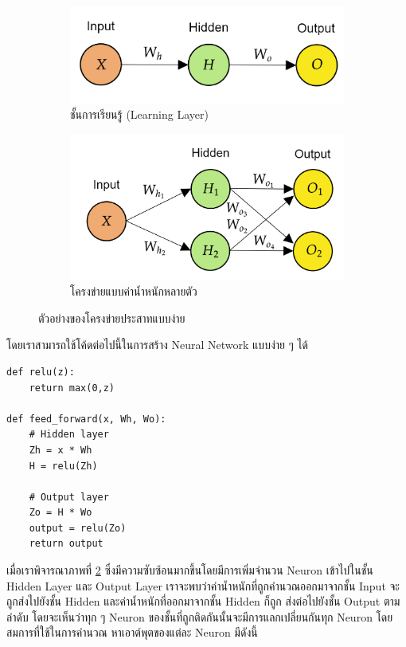 \begin{figure}[H]
    \centering
    \begin{subfigure}{0.5\textwidth}
        \centering
        \includegraphics[width=0.9\linewidth]{fig/nn_layer.png}
        \caption{ชั้นการเรียนรู้ (Learning Layer)}
        \label{fig:nn_layer}
    \end{subfigure}%
    \begin{subfigure}{0.5\textwidth}
        \centering
        \includegraphics[width=0.9\linewidth]{fig/nn_w_matrices.png}
        \caption{โครงข่ายแบบค่าน้ำหนักหลายตัว}
        \label{fig:nn_w_matrices}
    \end{subfigure}
    \caption{ตัวอย่างของโครงข่ายประสาทแบบง่าย}
    \label{fig:nn_layer_w}
\end{figure}

โดยเราสามารถใช้โค้ดต่อไปนี้ในการสร้าง Neural Network แบบง่าย ๆ ได้

\begin{lstlisting}[style=MyPython]
def relu(z):
    return max(0,z)

def feed_forward(x, Wh, Wo):
    # Hidden layer
    Zh = x * Wh
    H = relu(Zh)

    # Output layer
    Zo = H * Wo
    output = relu(Zo)
    return output
\end{lstlisting}

เมื่อเราพิจารณาภาพที่ \ref{fig:nn_w_matrices} ซึ่งมีความซับซ้อนมากขึ้นโดยมีการเพิ่มจำนวน Neuron เข้าไปในชั้น Hidden Layer และ 
Output Layer เราจะพบว่าค่าน้ำหนักที่ถูกคำนวณออกมาจากชั้น Input จะถูกส่งไปยังชั้น Hidden และค่าน้ำหนักที่ออกมาจากชั้น Hidden ก็ถูก%
ส่งต่อไปยังชั้น Output ตามลำดับ โดยจะเห็นว่าทุก ๆ Neuron ของชั้นที่ถูกติดกันนั้นจะมีการแลกเปลี่ยนกันทุก Neuron โดยสมการที่ใช้ในการคำนวณ%
หาเอาต์พุตของแต่ละ Neuron มีดังนี้

